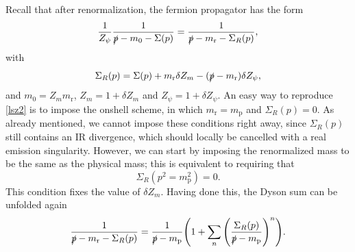 \documentclass[11pt]{article}
\begin{document}
Recall that after renormalization, the fermion propagator has the form   
\begin{equation}
\frac{1}{Z_\psi}\frac{1}{\slashed p -m_0-\Sigma(p)}=\frac{1}{\slashed p -m_\text{r}-\Sigma_R(p)},
\end{equation}
with
\begin{equation}
\Sigma_R(p)=\Sigma(p)+m_\text{r} \delta Z_m - (\slashed p - m_\text{r})\delta Z_\psi,
\end{equation}
and $m_0=Z_m m_\text{r}$, $Z_m=1+\delta Z_m$ and $Z_\psi=1+\delta Z_\psi$. An easy way to reproduce \eqref{lsz2} is to impose the onshell scheme, in which $m_\text{r}=m_\text{p}$ and $\Sigma_R(p)=0$. As already mentioned, we cannot impose these conditions right away, since $\Sigma_R(p)$ still contains an IR divergence, which should locally be cancelled with a real emission singularity. However, we can start by imposing the renormalized mass to be the same as the physical mass; this is equivalent to requiring that
\begin{equation}\label{onshell1}
\Sigma_R(p^2=m_\text{p}^2)=0.
\end{equation}
This condition fixes the value of $\delta Z_m$. Having done this, the Dyson sum can be unfolded again
\begin{equation}
\frac{1}{\slashed p -m_\text{r}-\Sigma_R(p)}=\frac{1}{\slashed p -m_\text{p}}\Bigg(1+\sum_n \Bigg(\frac{\Sigma_R(p)}{\slashed p -m_\text{p}}\Bigg)^n\Bigg).
\end{equation}
\end{document}
